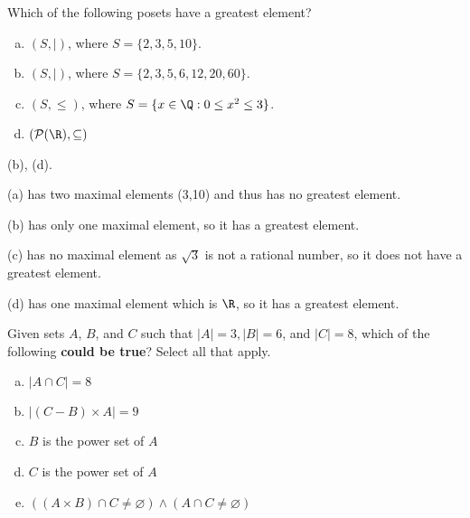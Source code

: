 Which of the following posets have a greatest element?
\begin{enumerate}[(a)]
	\item  
    $(S, |)$, where $S = \{2, 3, 5, 10\}$.
    
	\item  
    $(S, |)$, where $S = \{2, 3, 5, 6, 12, 20, 60 \}$.
    
	\item  
    $(S, \leq)$, where $S = \{x \in \Q: 0 \leq x^2 \leq 3\}$.
    
	\item  
    $(\mathcal{P}(\R), \subseteq)$

\end{enumerate}
\begin{solution}

(b), (d).

(a) has two maximal elements (3,10) and thus has no greatest element.

(b) has only one maximal element, so it has a greatest element.

(c) has no maximal element as $\sqrt{3}$ is not a rational number, so it does not have a greatest element.

(d) has one maximal element which is $\R$, so it has a greatest element.


\end{solution}


Given sets $A$, $B$, and $C$ such that $|A| = 3, |B| = 6$, and $|C| = 8$, which of the following \textbf{could be true}? Select all that apply.


\begin{enumerate} [(a)]
    \item $|A \cap C| = 8$
    \item $|(C - B) \times A| = 9$
    \item $B$ is the power set of $A$
    \item $C$ is the power set of $A$
    \item $\left( (A \times B) \cap C \neq \varnothing \right) \wedge \left( A \cap C \neq \varnothing \right)$
\end{enumerate}



